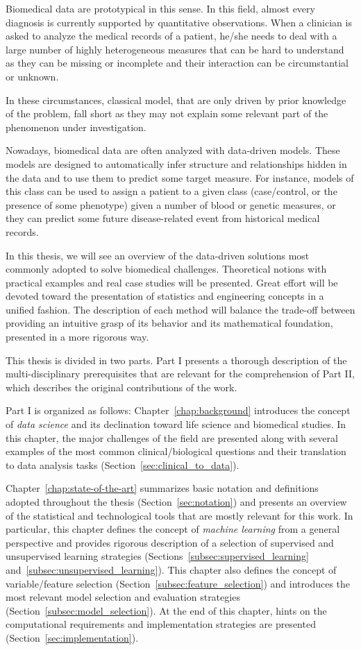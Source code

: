 Biomedical data are prototypical in this sense. In this field, almost every diagnosis is currently supported by quantitative observations.
When a clinician is asked to analyze the medical records of a patient, he/she needs to deal with a large number of highly heterogeneous measures that can be hard to understand as they can be missing or incomplete and their interaction can be circumstantial or unknown.

In these circumstances, classical model, that are only driven by prior knowledge of the problem, fall short as they may not explain some relevant part of the phenomenon under investigation.

Nowadays, biomedical data are often analyzed with data-driven models. These models are designed to automatically infer structure and relationships hidden in the data and to use them to predict some target measure. For instance, models of this class can be used to assign a patient to a given class (\eg case/control, or the presence of some phenotype) given a number of blood or genetic measures, or they can predict some future disease-related event from historical medical records.

In this thesis, we will see an overview of the data-driven solutions most commonly adopted to solve biomedical challenges. Theoretical notions with practical examples and real case studies will be presented. Great effort will be devoted toward the presentation of statistics and engineering concepts in a unified fashion. The description of each method will balance the trade-off between providing an intuitive grasp of its behavior and its mathematical foundation, presented in a more rigorous way.

This thesis is divided in two parts. Part I presents a thorough description of the multi-disciplinary prerequisites that are relevant for the comprehension of Part II, which describes the original contributions of the work.

Part I is organized as follows: Chapter~\ref{chap:background} introduces the concept of \textit{data science} and its declination toward life science and biomedical studies. In this chapter, the major challenges of the field are presented along with several examples of the most common clinical/biological questions and their translation to data analysis tasks (Section~\ref{sec:clinical_to_data}).

Chapter~\ref{chap:state-of-the-art} summarizes basic notation and definitions adopted throughout the thesis (Section~\ref{sec:notation}) and presents an overview of the statistical and technological tools that are mostly relevant for this work. In particular, this chapter defines the concept of \textit{machine learning} from a general perspective and provides rigorous description of a selection of supervised and unsupervised learning strategies (Sections~\ref{subsec:supervised_learning} and~\ref{subsec:unsupervised_learning}).
This chapter also defines the concept of variable/feature selection (Section~\ref{subsec:feature_selection}) and introduces the most relevant model selection and evaluation strategies (Section~\ref{subsec:model_selection}).
At the end of this chapter, hints on the computational requirements and implementation strategies are presented (Section~\ref{sec:implementation}).


